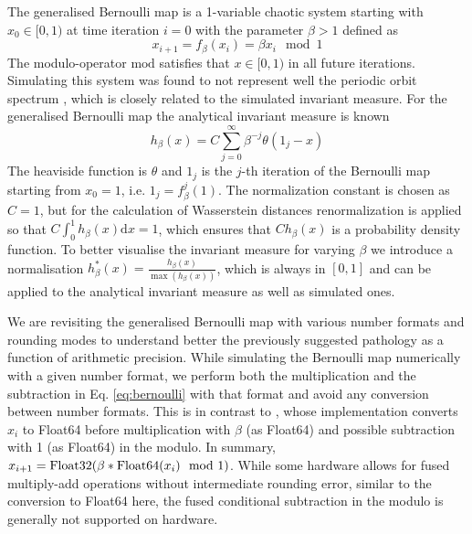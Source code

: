 The generalised Bernoulli map \citep{Parry1960} is a 1-variable chaotic system starting with $x_0 \in [0,1)$
at time iteration $i=0$ with the parameter $\beta > 1$ defined as
\begin{equation}
	x_{i+1} = f_\beta(x_i) = \beta x_i \mod 1
	\label{eq:bernoulli}
\end{equation}
The modulo-operator $\mathrm{mod}$ satisfies that $x \in [0,1)$ in all future iterations. Simulating this system was found to not represent
well the periodic orbit spectrum \citep{Boghosian2019}, which is closely related to the simulated invariant measure. For the
generalised Bernoulli map the analytical invariant measure is known \citep{Hofbauer1978}
\begin{equation}
	h_\beta(x) = C\sum_{j=0}^\infty \beta^{-j} \theta(1_j - x)
	\label{eq:hofbauer}
\end{equation}
The heaviside function is $\theta$ and $1_j$ is the $j$-th iteration of the Bernoulli map starting from $x_0 = 1$, i.e. $1_j = f_\beta^j(1)$.
The normalization constant is chosen as $C=1$, but for the calculation of Wasserstein distances renormalization is applied so that
$C\int_0^1h_\beta(x) \mathrm{d}x = 1$, which ensures that $Ch_\beta(x)$ is a probability density function. To better visualise the
invariant measure for varying $\beta$ we introduce a normalisation $h_\beta^*(x) = \tfrac{h_\beta(x)}{\max(h_\beta(x))}$, which is always
in $[0,1]$ and can be applied to the analytical invariant measure as well as simulated ones.

We are revisiting the generalised Bernoulli map with various number formats and rounding modes to understand better the previously
suggested pathology \citep{Boghosian2019} as a function of arithmetic precision. While simulating the Bernoulli map numerically with
a given number format, we perform both the multiplication and the subtraction in Eq. \ref{eq:bernoulli} with that format and avoid any
conversion between number formats. This is in contrast to \cite{Boghosian2019}, whose implementation converts $x_i$ to Float64
before multiplication with $\beta$ (as Float64) and possible subtraction with 1 (as Float64) in the modulo. In summary, 
$x_{i+1} = \operatorname{Float32}(\beta * \operatorname{Float64}(x_i) \mod 1)$. While some hardware allows for fused multiply-add operations without
intermediate rounding error, similar to the conversion to Float64 here, the fused conditional subtraction in the modulo is generally not
supported on hardware.

